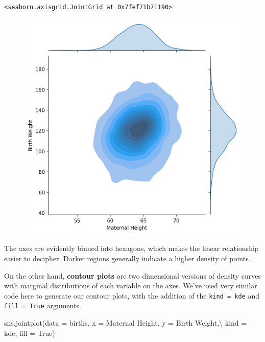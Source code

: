 \documentclass[
  letterpaper,
  DIV=11,
  numbers=noendperiod]{scrreprt}
\newenvironment{Shaded}{\begin{snugshade}}{\end{snugshade}}
\newcommand{\NormalTok}[1]{\textcolor[rgb]{0.00,0.23,0.31}{#1}}
\newcommand{\OperatorTok}[1]{\textcolor[rgb]{0.37,0.37,0.37}{#1}}
\newcommand{\StringTok}[1]{\textcolor[rgb]{0.13,0.47,0.30}{#1}}
\newcommand{\VariableTok}[1]{\textcolor[rgb]{0.07,0.07,0.07}{#1}}
\begin{document}
\begin{verbatim}
<seaborn.axisgrid.JointGrid at 0x7fef71b71190>
\end{verbatim}

\begin{figure}[H]

{\centering \includegraphics{visualization_2/visualization_2_files/figure-pdf/cell-11-output-2.png}

}

\end{figure}

The axes are evidently binned into hexagons, which makes the linear
relationship easier to decipher. Darker regions generally indicate a
higher density of points.

On the other hand, \textbf{contour plots} are two dimensional versions
of density curves with marginal distributions of each variable on the
axes. We've used very similar code here to generate our contour plots,
with the addition of the
\texttt{kind\ =\ \textquotesingle{}kde\textquotesingle{}} and
\texttt{fill\ =\ True} arguments.

\begin{Shaded}
\begin{Highlighting}[]
\NormalTok{sns.jointplot(data }\OperatorTok{=}\NormalTok{ births, x }\OperatorTok{=} \StringTok{\textquotesingle{}Maternal Height\textquotesingle{}}\NormalTok{, y }\OperatorTok{=} \StringTok{\textquotesingle{}Birth Weight\textquotesingle{}}\NormalTok{,}\OperatorTok{\textbackslash{}}
\NormalTok{              kind }\OperatorTok{=} \StringTok{\textquotesingle{}kde\textquotesingle{}}\NormalTok{, fill }\OperatorTok{=} \VariableTok{True}\NormalTok{)}
\end{Highlighting}
\end{Shaded}
\end{document}
